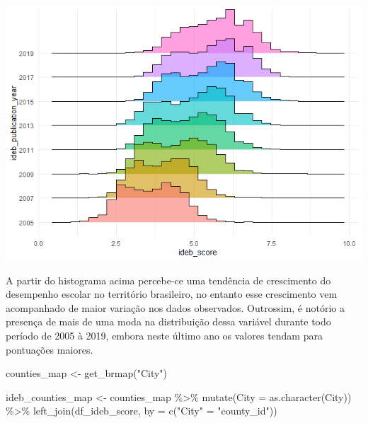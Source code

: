 \documentclass[
]{article}
\newenvironment{Shaded}{\begin{snugshade}}{\end{snugshade}}
\newcommand{\AttributeTok}[1]{\textcolor[rgb]{0.77,0.63,0.00}{#1}}
\newcommand{\FunctionTok}[1]{\textcolor[rgb]{0.00,0.00,0.00}{#1}}
\newcommand{\NormalTok}[1]{#1}
\newcommand{\OtherTok}[1]{\textcolor[rgb]{0.56,0.35,0.01}{#1}}
\newcommand{\SpecialCharTok}[1]{\textcolor[rgb]{0.00,0.00,0.00}{#1}}
\newcommand{\StringTok}[1]{\textcolor[rgb]{0.31,0.60,0.02}{#1}}
\begin{document}
\includegraphics{report_files/figure-gfm/unnamed-chunk-1-1.png}

A partir do histograma acima percebe-ce uma tendência de crescimento do
desempenho escolar no território brasileiro, no entanto esse crescimento
vem acompanhado de maior variação nos dados observados. Outrossim, é
notório a presença de mais de uma moda na distribuição dessa variável
durante todo período de 2005 à 2019, embora neste último ano os valores
tendam para pontuações maiores.

\begin{Shaded}
\begin{Highlighting}[]
\NormalTok{counties\_map }\OtherTok{\textless{}{-}} \FunctionTok{get\_brmap}\NormalTok{(}\StringTok{"City"}\NormalTok{) }
\end{Highlighting}
\end{Shaded}

\begin{Shaded}
\begin{Highlighting}[]
\NormalTok{ideb\_counties\_map }\OtherTok{\textless{}{-}}\NormalTok{ counties\_map }\SpecialCharTok{\%\textgreater{}\%}
  \FunctionTok{mutate}\NormalTok{(}\AttributeTok{City =} \FunctionTok{as.character}\NormalTok{(City)) }\SpecialCharTok{\%\textgreater{}\%}
  \FunctionTok{left\_join}\NormalTok{(df\_ideb\_score,}
            \AttributeTok{by =} \FunctionTok{c}\NormalTok{(}\StringTok{"City"} \OtherTok{=} \StringTok{"county\_id"}\NormalTok{))}
\end{Highlighting}
\end{Shaded}
\end{document}
